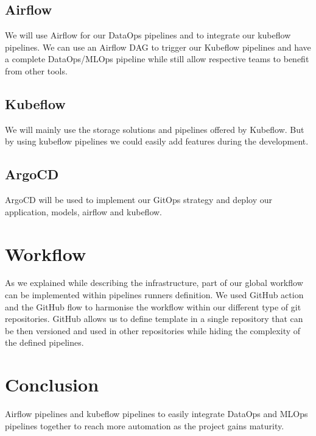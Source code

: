 \subsection{Airflow}\label{subsec:airflow}
We will use Airflow for our DataOps pipelines and to integrate our kubeflow pipelines.
We can use an Airflow DAG to trigger our Kubeflow pipelines and have a complete DataOps/MLOps pipeline while still allow respective teams
to benefit from other tools.

\subsection{Kubeflow}\label{subsec:kubeflow}
We will mainly use the storage solutions and pipelines offered by Kubeflow.
But by using kubeflow pipelines we could easily add features during the development.

\subsection{ArgoCD}\label{subsec:argocd}
ArgoCD will be used to implement our GitOps strategy and deploy our application, models, airflow and kubeflow.



\section{Workflow}\label{sec:workflow}
As we explained while describing the infrastructure, part of our global workflow can be implemented within pipelines runners definition.
We used GitHub action and the GitHub flow to harmonise the workflow within our different type of git repositories.
GitHub allows us to define template in a single repository that can be then versioned and used in other repositories while hiding the complexity of the defined pipelines.



\section{Conclusion}\label{sec:conclusion}
Airflow pipelines and kubeflow pipelines to easily integrate DataOps and MLOps pipelines together to reach more automation as the project gains maturity.

